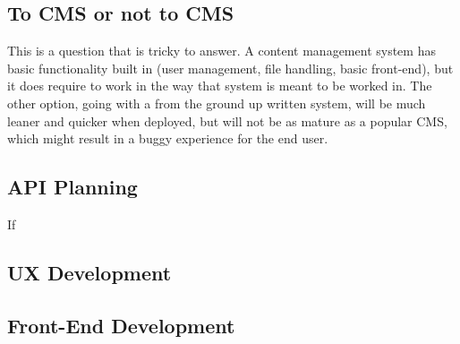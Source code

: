 \subsection{To CMS or not to CMS}
This is a question that is tricky to answer. A content management system has basic functionality built in (user management, file handling, basic front-end), but it does require to work in the way that system is meant to be worked in. The other option, going with a from the ground up written system, will be much leaner and quicker when deployed, but will not be as mature as a popular CMS, which might result in a buggy experience for the end user.
\subsection{API Planning}
If 
\subsection{UX Development}
\subsection{Front-End Development}

\newpage
